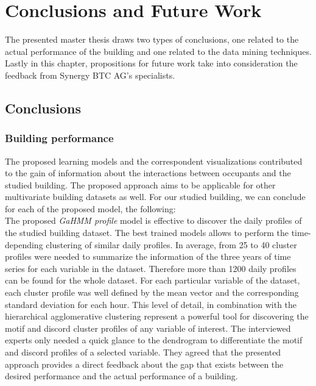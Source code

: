 \chapter{Conclusions and Future Work} %
\label{Chapter6} %
\minitoc



The presented master thesis draws two types of conclusions, one related to the actual performance of the building and one related to the data mining techniques. Lastly in this chapter, propositions for future work take into consideration the feedback from Synergy BTC AG's specialists.

\section{Conclusions}
\subsection{Building performance} 


The proposed learning models and the correspondent visualizations contributed to the gain of information about the interactions between occupants and the studied building. The proposed approach aims to be applicable for other multivariate building datasets as well. For our studied building, we can conclude for each of the proposed model, the following:\\


The proposed \textit{GaHMM profile} model is effective to discover the daily profiles of the studied building dataset. The best trained models allows to perform the time-depending clustering of similar daily profiles. In average, from 25 to 40 cluster profiles were needed to summarize the information of the three years of time series for each variable in the dataset. Therefore more than 1200 daily profiles can be found for the whole dataset. For each particular variable of the dataset, each cluster profile was well defined by the mean vector and the corresponding standard deviation for each hour. This level of detail, in combination with the hierarchical agglomerative clustering represent a powerful tool for discovering the motif and discord cluster profiles of any variable of interest. The interviewed experts only needed a quick glance to the dendrogram to differentiate the motif and discord profiles of a selected variable. They agreed that the presented approach provides a direct feedback about the gap that exists between the desired performance and the actual performance of a building.   \\ 

